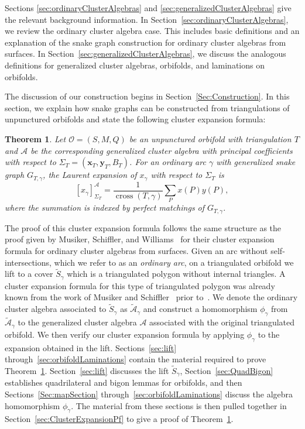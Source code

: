 \documentclass[pdftex]{sigma}%
\numberwithin{equation}{section}
\newtheorem{Theorem}{Theorem}[section]
\begin{document}
Sections \ref{sec:ordinaryClusterAlgebras} and \ref{sec:generalizedClusterAlgebras} give the relevant background information. In Section~\ref{sec:ordinaryClusterAlgebras}, we review the ordinary cluster algebra case. This includes basic definitions and an explanation of the snake graph construction for ordinary cluster algebras from surfaces. In Section~\ref{sec:generalizedClusterAlgebras}, we discuss the analogous definitions for generalized cluster algebras, orbifolds, and laminations on orbifolds.

The discussion of our construction begins in Section~\ref{Sec:Construction}. In this section, we explain how snake graphs can be constructed from triangulations of unpunctured orbifolds and state the following cluster expansion formula:

\begin{Theorem}\label{Thm:GenSnake}
Let $\mathcal{O} = (S,M,Q)$ be an unpunctured orbifold with triangulation $T$ and $\mathcal{A}$ be the corresponding generalized cluster algebra with principal coefficients with respect to $\Sigma_T = (\mathbf{x}_T,\mathbf{y}_T,B_T)$. For an ordinary arc $\gamma$ with generalized snake graph $G_{T,\gamma}$, the Laurent expansion of $x_\gamma$ with respect to $\Sigma_T$ is
\[ [x_\gamma]^{\mathcal{A}}_{\Sigma_T} = \frac{1}{\operatorname{cross}(T,\gamma)} \sum_P x(P)y(P), \]
where the summation is indexed by perfect matchings of $G_{T,\gamma}$.
\end{Theorem}

The proof of this cluster expansion formula follows the same structure as the proof given by Musiker, Schiffler, and Williams~\cite{MSW} for their cluster expansion formula for ordinary cluster algebras from surfaces. Given an arc without self-intersections, which we refer to as an \emph{ordinary arc}, on a triangulated orbifold we lift to a cover $\widetilde{S}_\gamma$ which is a triangulated polygon without internal triangles. A cluster expansion formula for this type of triangulated polygon was already known from the work of Musiker and Schiffler~\cite{Musiker-Schiffler} prior to~\cite{MSW}. We denote the ordinary cluster algebra associated to $\widetilde{S}_\gamma$ as $\widetilde{\mathcal{A}}_\gamma$ and construct a homomorphism $\phi_\gamma$ from $\widetilde{\mathcal{A}}_\gamma$ to the generalized cluster algebra $\mathcal{A}$ associated with the original triangulated orbifold. We then verify our cluster expansion formula by applying $\phi_\gamma$ to the expansion obtained in the lift. Sections~\ref{sec:lift} through~\ref{sec:orbifoldLaminations} contain the material required to prove Theorem~\ref{Thm:GenSnake}. Section~\ref{sec:lift} discusses the lift $\widetilde{S}_\gamma$, Section~\ref{sec:QuadBigon} establishes quadrilateral and bigon lemmas for orbifolds, and then Sections~\ref{Sec:mapSection} through~\ref{sec:orbifoldLaminations} discuss the algebra homomorphism $\phi_\gamma$. The material from these sections is then pulled together in Section~\ref{sec:ClusterExpansionPf} to give a proof of Theorem~\ref{Thm:GenSnake}.
\end{document}
